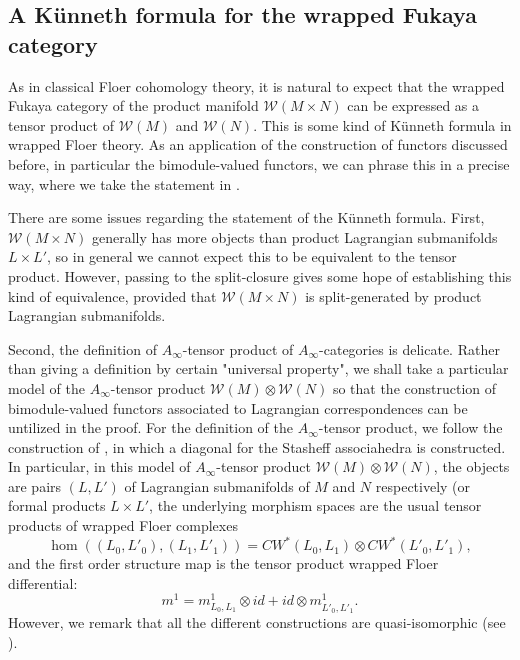 \documentclass{amsart}
\numberwithin{equation}{section}
\numberwithin{figure}{section}
\begin{document}
\subsection{A K\"{u}nneth formula for the wrapped Fukaya category} \label{section: Kunneth formula}
	As in classical Floer cohomology theory, it is natural to expect that the wrapped Fukaya category of the product manifold $\mathcal{W}(M \times N)$ can be expressed as a tensor product of $\mathcal{W}(M)$ and $\mathcal{W}(N)$. This is some kind of K\"{u}nneth formula in wrapped Floer theory. As an application of the construction of functors discussed before, in particular the bimodule-valued functors, we can phrase this in a precise way, where we take the statement in \cite{Ganatra-Pardon-Shende}. \par
	There are some issues regarding the statement of the K\"{u}nneth formula. First, $\mathcal{W}(M \times N)$ generally has more objects than product Lagrangian submanifolds $L \times L'$, so in general we cannot expect this to be equivalent to the tensor product. However, passing to the split-closure gives some hope of establishing this kind of equivalence, provided that $\mathcal{W}(M \times N)$ is split-generated by product Lagrangian submanifolds. \par
	Second, the definition of $A_{\infty}$-tensor product of $A_{\infty}$-categories is delicate. Rather than giving a definition by certain "universal property", we shall take a particular model of the $A_{\infty}$-tensor product $\mathcal{W}(M) \otimes \mathcal{W}(N)$ so that the construction of bimodule-valued functors associated to Lagrangian correspondences can be untilized in the proof. For the definition of the $A_{\infty}$-tensor product, we follow the construction of \cite{Saneblidze-Umble}, in which a diagonal for the Stasheff associahedra is constructed. In particular, in this model of $A_{\infty}$-tensor product $\mathcal{W}(M) \otimes \mathcal{W}(N)$, the objects are pairs $(L, L')$ of Lagrangian submanifolds of $M$ and $N$ respectively (or formal products $L \times L'$, the underlying morphism spaces are the usual tensor products of wrapped Floer complexes
\begin{equation}
\hom((L_{0}, L'_{0}), (L_{1}, L'_{1})) = CW^{*}(L_{0}, L_{1}) \otimes CW^{*}(L'_{0}, L'_{1}),
\end{equation}
and the first order structure map is the tensor product wrapped Floer differential:
\begin{equation}
m^{1} = m^{1}_{L_{0}, L_{1}} \otimes id + id \otimes m^{1}_{L'_{0}, L'_{1}}.
\end{equation}
However, we remark that all the different constructions are quasi-isomorphic (see \cite{Markl-Shnider}). \par
\end{document}
